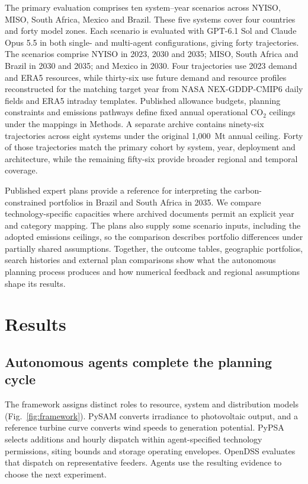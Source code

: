 \documentclass[pdflatex,sn-nature]{sn-jnl}
\begin{document}
The primary evaluation comprises ten system--year scenarios across NYISO, MISO, South Africa, Mexico and Brazil. These five systems cover four countries and forty model zones. Each scenario is evaluated with GPT-6.1 Sol and Claude Opus 5.5 in both single- and multi-agent configurations, giving forty trajectories. The scenarios comprise NYISO in 2023, 2030 and 2035; MISO, South Africa and Brazil in 2030 and 2035; and Mexico in 2030. Four trajectories use 2023 demand and ERA5 resources, while thirty-six use future demand and resource profiles reconstructed for the matching target year from NASA NEX-GDDP-CMIP6 daily fields and ERA5 intraday templates. Published allowance budgets, planning constraints and emissions pathways define fixed annual operational CO$_2$ ceilings under the mappings in Methods. A separate archive contains ninety-six trajectories across eight systems under the original 1,000~Mt annual ceiling. Forty of those trajectories match the primary cohort by system, year, deployment and architecture, while the remaining fifty-six provide broader regional and temporal coverage.

Published expert plans provide a reference for interpreting the carbon-constrained portfolios in Brazil and South Africa in 2035. We compare technology-specific capacities where archived documents permit an explicit year and category mapping. The plans also supply some scenario inputs, including the adopted emissions ceilings, so the comparison describes portfolio differences under partially shared assumptions. Together, the outcome tables, geographic portfolios, search histories and external plan comparisons show what the autonomous planning process produces and how numerical feedback and regional assumptions shape its results.

\section{Results}\label{sec:results}

\subsection{Autonomous agents complete the planning cycle}

The framework assigns distinct roles to resource, system and distribution models (Fig.~\ref{fig:framework}). PySAM converts irradiance to photovoltaic output, and a reference turbine curve converts wind speeds to generation potential. PyPSA selects additions and hourly dispatch within agent-specified technology permissions, siting bounds and storage operating envelopes. OpenDSS evaluates that dispatch on representative feeders. Agents use the resulting evidence to choose the next experiment.
\end{document}
